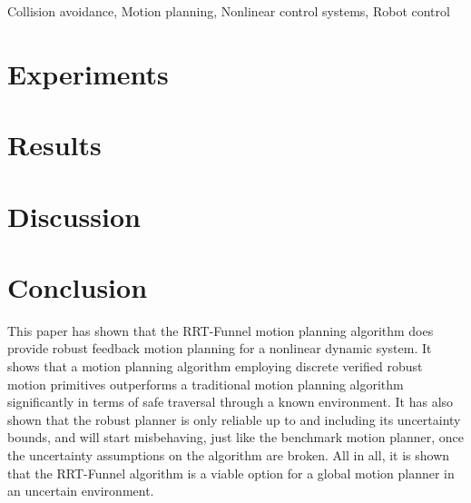 \documentclass{IEEEtran}
\newcommand{\rrtfunnel}{RRT-Funnel}
\newcommand{\0}{\mathbf{0}}
\newcommand{\1}{\mathbf{1}}
\begin{document}
\begin{IEEEkeywords}
  Collision avoidance, Motion planning, Nonlinear control systems, Robot control
\end{IEEEkeywords}



\label{sec:Method}



\section{Experiments}
\label{sec:Experiments}


\section{Results}


\section{Discussion}


\section{Conclusion}

This paper has shown that the \rrtfunnel{} motion planning algorithm does
provide robust feedback motion planning for a nonlinear dynamic system. It shows
that a motion planning algorithm employing discrete verified robust motion
primitives outperforms a traditional motion planning algorithm significantly in
terms of safe traversal through a known environment. It has also shown that the
robust planner is only reliable up to and including its uncertainty bounds, and
will start misbehaving, just like the benchmark motion planner, once the
uncertainty assumptions on the algorithm are broken. All in all, it is shown
that the \rrtfunnel{} algorithm is a viable option for a global motion planner
in an uncertain environment.



\end{document}
